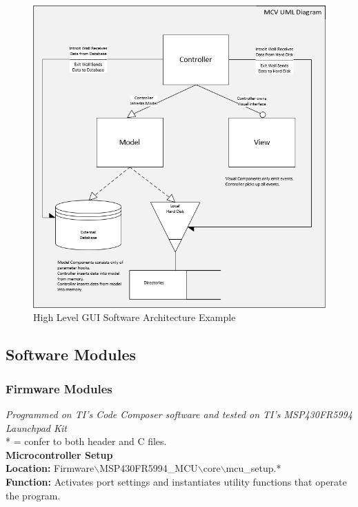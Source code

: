 \documentclass[12pt]{article}
\begin{document}
\begin{figure}[h!]
\centering
\includegraphics[width=0.88\linewidth]{mcv_arch}
\caption{High Level GUI Software Architecture Example}
\end{figure}

\hfill
\pagebreak

\subsection{Software Modules}

\subsubsection{Firmware Modules} \textit{Programmed on TI's Code Composer software and tested on TI's MSP430FR5994 Launchpad Kit}\\

\indent
* = confer to both header and C files.\\

\noindent
\textbf{
Microcontroller Setup \\
Location: 
}
\space Firmware$\backslash$MSP430FR5994\_MCU$\backslash$core$\backslash$mcu\_setup.*\\
\textbf{
Function: }
Activates port settings and instantiates utility functions that operate the program.\\
\end{document}
